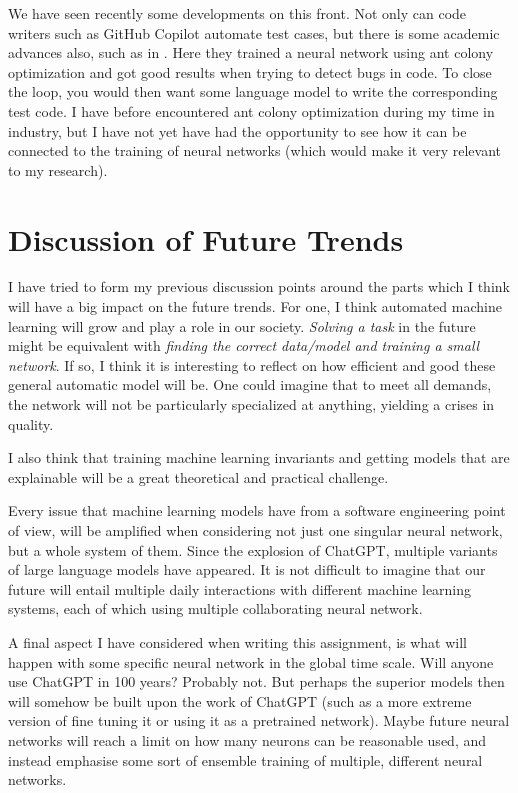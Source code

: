 \documentclass[11pt]{article}
\begin{document}
We have seen recently some developments on this front. Not only can code writers such as GitHub Copilot automate test cases, but there is some academic advances also, such as in \cite{shakya2020reliable}. Here they trained a neural network using ant colony optimization and got good results when trying to detect bugs in code. To close the loop, you would then want some language model to write the corresponding test code. I have before encountered ant colony optimization during my time in industry, but I have not yet have had the opportunity to see how it can be connected to the training of neural networks (which would make it very relevant to my research).


\section*{Discussion of Future Trends}

I have tried to form my previous discussion points around the parts which I think will have a big impact on the future trends. For one, I think automated machine learning will grow and play a role in our society. \textit{Solving a task} in the future might be equivalent with \textit{finding the correct data/model and training a small network}. If so, I think it is interesting to reflect on how efficient and good these general automatic model will be. One could imagine that to meet all demands, the network will not be particularly specialized at anything, yielding a crises in quality. 

I also think that training machine learning invariants and getting models that are explainable will be a great theoretical and practical challenge. 

Every issue that machine learning models have from a software engineering point of view, will be amplified when considering not just one singular neural network, but a whole system of them. Since the explosion of ChatGPT, multiple variants of large language models have appeared. It is not difficult to imagine that our future will entail multiple daily interactions with different machine learning systems, each of which using multiple collaborating neural network. 

A final aspect I have considered when writing this assignment, is what will happen with some specific neural network in the global time scale. Will anyone use ChatGPT in 100 years? Probably not. But perhaps the superior models then will somehow be built upon the work of ChatGPT (such as a more extreme version of fine tuning it or using it as a pretrained network). Maybe future neural networks will reach a limit on how many neurons can be reasonable used, and instead emphasise some sort of ensemble training of multiple, different neural networks.  

\newpage
\printbibliography
\end{document}
